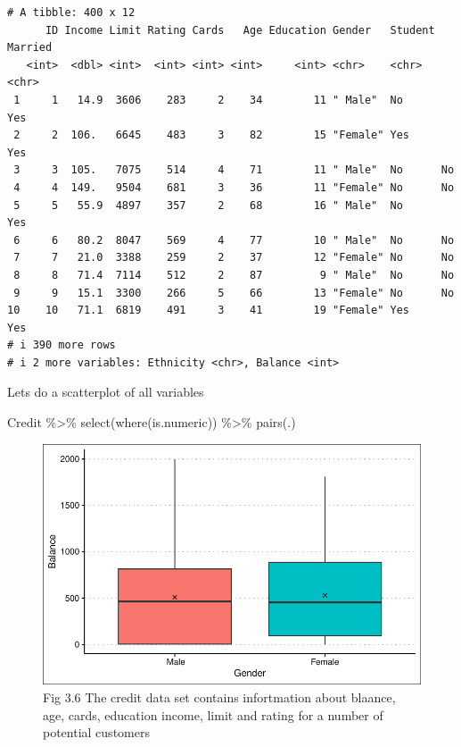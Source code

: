 \documentclass[
  letterpaper,
  DIV=11,
  numbers=noendperiod]{scrreprt}
\newenvironment{Shaded}{\begin{snugshade}}{\end{snugshade}}
\newcommand{\FunctionTok}[1]{\textcolor[rgb]{0.02,0.16,0.49}{#1}}
\newcommand{\NormalTok}[1]{\textcolor[rgb]{0.33,0.33,0.33}{#1}}
\newcommand{\SpecialCharTok}[1]{\textcolor[rgb]{0.00,0.46,0.62}{#1}}
\begin{document}
\begin{verbatim}
# A tibble: 400 x 12
      ID Income Limit Rating Cards   Age Education Gender   Student Married
   <int>  <dbl> <int>  <int> <int> <int>     <int> <chr>    <chr>   <chr>  
 1     1   14.9  3606    283     2    34        11 " Male"  No      Yes    
 2     2  106.   6645    483     3    82        15 "Female" Yes     Yes    
 3     3  105.   7075    514     4    71        11 " Male"  No      No     
 4     4  149.   9504    681     3    36        11 "Female" No      No     
 5     5   55.9  4897    357     2    68        16 " Male"  No      Yes    
 6     6   80.2  8047    569     4    77        10 " Male"  No      No     
 7     7   21.0  3388    259     2    37        12 "Female" No      No     
 8     8   71.4  7114    512     2    87         9 " Male"  No      No     
 9     9   15.1  3300    266     5    66        13 "Female" No      No     
10    10   71.1  6819    491     3    41        19 "Female" Yes     Yes    
# i 390 more rows
# i 2 more variables: Ethnicity <chr>, Balance <int>
\end{verbatim}

Lets do a scatterplot of all variables

\begin{Shaded}
\begin{Highlighting}[]
\NormalTok{Credit }\SpecialCharTok{\%\textgreater{}\%} \FunctionTok{select}\NormalTok{(}\FunctionTok{where}\NormalTok{(is.numeric)) }\SpecialCharTok{\%\textgreater{}\%} \FunctionTok{pairs}\NormalTok{(.)}
\end{Highlighting}
\end{Shaded}

\begin{figure}[H]

{\centering \includegraphics{Chapter3_files/figure-pdf/unnamed-chunk-73-1.pdf}

}

\caption{Fig 3.6 The credit data set contains infortmation about
blaance, age, cards, education income, limit and rating for a number of
potential customers}

\end{figure}
\end{document}
